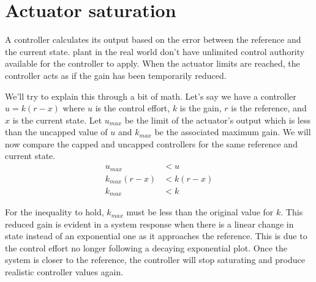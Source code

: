 \section{Actuator saturation}

A controller calculates its output based on the error between the
\gls{reference} and the current \gls{state}. \Gls{plant} in the real world don't
have unlimited control authority available for the controller to apply. When the
actuator limits are reached, the controller acts as if the gain has been
temporarily reduced.

We'll try to explain this through a bit of math. Let's say we have a controller
$u = k(r - x)$ where $u$ is the \gls{control effort}, $k$ is the gain, $r$ is
the \gls{reference}, and $x$ is the current \gls{state}. Let $u_{max}$ be the
limit of the actuator's output which is less than the uncapped value of $u$ and
$k_{max}$ be the associated maximum gain. We will now compare the capped and
uncapped controllers for the same \gls{reference} and current \gls{state}.
\begin{align*}
  u_{max} &< u \\
  k_{max}(r - x) &< k(r - x) \\
  k_{max} &< k
\end{align*}

For the inequality to hold, $k_{max}$ must be less than the original value for
$k$. This reduced gain is evident in a \gls{system response} when there is a
linear change in state instead of an exponential one as it approaches the
\gls{reference}. This is due to the \gls{control effort} no longer following a
decaying exponential plot. Once the \gls{system} is closer to the
\gls{reference}, the controller will stop saturating and produce realistic
controller values again.
